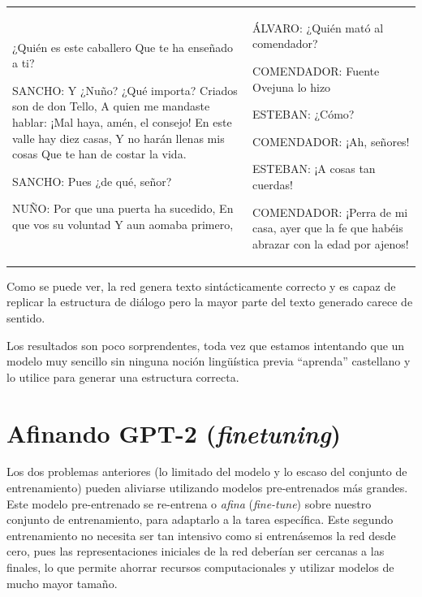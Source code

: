 \noindent
\begin{table}[h]
  \centering
  \begin{tabular}{ ll }
    \begin{Code}
    ¿Quién es este caballero
    Que te ha enseñado a ti?
    
    SANCHO:
    Y ¿Nuño? ¿Qué importa?
    Criados son de don Tello,
    A quien me mandaste hablar:
    ¡Mal haya, amén, el consejo!
    En este valle hay diez casas,
    Y no harán llenas mis cosas
    Que te han de costar la vida.
    
    SANCHO:
    Pues ¿de qué, señor?

    NUÑO:
    Por que una puerta ha sucedido,
    En que vos su voluntad
    Y aun aomaba primero,
    \end{Code}
    & 
    \begin{Code}
    ÁLVARO:
    ¿Quién mató al comendador?
    
    COMENDADOR:
    Fuente Ovejuna lo hizo
    
    ESTEBAN:
    ¿Cómo?
    
    COMENDADOR:
    ¡Ah, señores!
    
    ESTEBAN:
    ¡A cosas tan cuerdas!

    COMENDADOR:
    ¡Perra de mi casa, ayer
    que la fe que habéis abrazar
    con la edad por ajenos!
    \end{Code}
  \end{tabular}
\end{table}

Como se puede ver, la red genera texto sintácticamente correcto y es capaz de replicar la estructura de diálogo pero la mayor parte del texto generado carece de sentido. 

Los resultados son poco sorprendentes, toda vez que estamos intentando que un modelo  muy sencillo sin ninguna noción lingüística previa ``aprenda'' castellano y lo utilice para generar una estructura correcta. 

\section{Afinando GPT-2 (\textit{finetuning})}
Los dos problemas anteriores (lo limitado del modelo y lo escaso del conjunto de entrenamiento) pueden aliviarse utilizando modelos pre-entrenados más grandes. Este modelo pre-entrenado se re-entrena o \textit{afina} (\textit{fine-tune}) sobre nuestro conjunto de entrenamiento, para adaptarlo a la tarea específica. Este segundo entrenamiento no necesita ser tan intensivo como si entrenásemos la red desde cero, pues las representaciones iniciales de la red deberían ser cercanas a las finales, lo que permite ahorrar recursos computacionales y utilizar modelos de mucho mayor tamaño.

